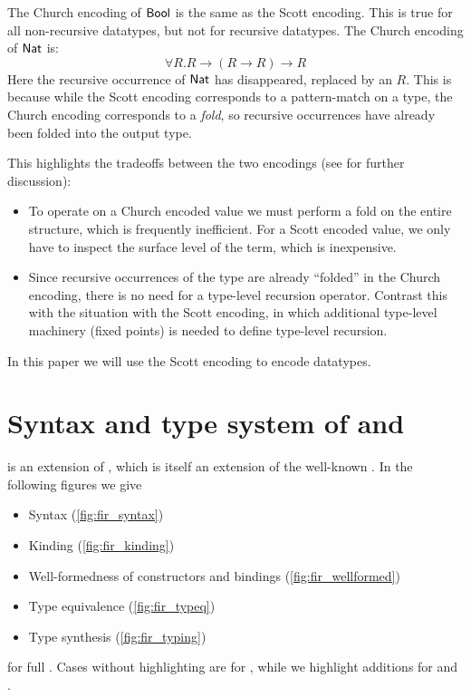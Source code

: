 The Church encoding of $\operatorname{\textsf{Bool}}$ is the same as the Scott encoding. This is true
for all non-recursive datatypes, but not for recursive datatypes. The Church
encoding of $\operatorname{\textsf{Nat}}$ is:
\begin{displaymath}
  \forall R . R \rightarrow (R \rightarrow R) \rightarrow R
\end{displaymath}
Here the recursive occurrence of $\operatorname{\textsf{Nat}}$ has disappeared, replaced by
an $R$. This is because while the Scott encoding corresponds to a pattern-match on a type,
the Church encoding corresponds to a \emph{fold}, so recursive occurrences have
already been folded into the output type.

This highlights the tradeoffs between the two encodings (see \cite{scott} for
further discussion):
\begin{itemize}
  \item To operate on a Church encoded value we must perform a fold on the
    entire structure, which is frequently inefficient. For a Scott encoded value,
    we only have to inspect the surface level of the term, which is inexpensive.
  \item Since recursive occurrences of the type are already ``folded'' in the
    Church encoding, there is no need for a type-level recursion operator. Contrast
    this with the situation with the Scott encoding, in which additional type-level machinery
    (fixed points) is needed to define type-level recursion.
\end{itemize}

In this paper we will use the Scott encoding to encode datatypes.

\section{Syntax and type system of \FOMF{} and \FIR{}}

\FIR{} is an extension of \FOMF{}, which is itself an extension of the
well-known \FOM{}. In the following figures we give
\begin{itemize}
\item Syntax (\cref{fig:fir_syntax})
\item Kinding (\cref{fig:fir_kinding})
\item Well-formedness of constructors and bindings (\cref{fig:fir_wellformed})
\item Type equivalence (\cref{fig:fir_typeq})
\item Type synthesis (\cref{fig:fir_typing})
\end{itemize}
for full \FIR{}. Cases without highlighting are for
\FOM{}, while we highlight additions for \fomfDiff{\FOMF{}} and \firDiff{\FIR{}}.

